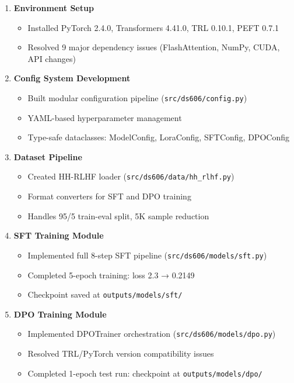 \documentclass[11pt,a4paper]{article}
\begin{document}
\begin{enumerate}
    \item[\textcolor{completed}{✓}] \textbf{Environment Setup}
    \begin{itemize}
        \item Installed PyTorch 2.4.0, Transformers 4.41.0, TRL 0.10.1, PEFT 0.7.1
        \item Resolved 9 major dependency issues (FlashAttention, NumPy, CUDA, API changes)
    \end{itemize}

    \item[\textcolor{completed}{✓}] \textbf{Config System Development}
    \begin{itemize}
        \item Built modular configuration pipeline (\texttt{src/ds606/config.py})
        \item YAML-based hyperparameter management
        \item Type-safe dataclasses: ModelConfig, LoraConfig, SFTConfig, DPOConfig
    \end{itemize}

    \item[\textcolor{completed}{✓}] \textbf{Dataset Pipeline}
    \begin{itemize}
        \item Created HH-RLHF loader (\texttt{src/ds606/data/hh\_rlhf.py})
        \item Format converters for SFT and DPO training
        \item Handles 95/5 train-eval split, 5K sample reduction
    \end{itemize}

    \item[\textcolor{completed}{✓}] \textbf{SFT Training Module}
    \begin{itemize}
        \item Implemented full 8-step SFT pipeline (\texttt{src/ds606/models/sft.py})
        \item Completed 5-epoch training: loss 2.3 → 0.2149
        \item Checkpoint saved at \texttt{outputs/models/sft/}
    \end{itemize}

    \item[\textcolor{completed}{✓}] \textbf{DPO Training Module}
    \begin{itemize}
        \item Implemented DPOTrainer orchestration (\texttt{src/ds606/models/dpo.py})
        \item Resolved TRL/PyTorch version compatibility issues
        \item Completed 1-epoch test run: checkpoint at \texttt{outputs/models/dpo/}
    \end{itemize}


\end{enumerate}
\end{document}
